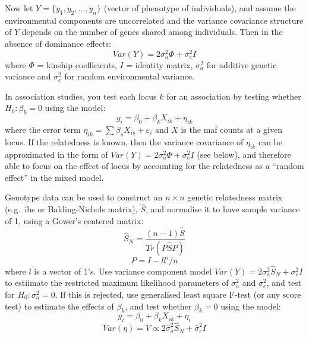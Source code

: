 Now let $Y = \{y_1, y_2,\ldots,y_n\}$ (vector of phenotype of individuals), and assume the environmental components are uncorrelated and the variance covariance structure of $Y$ depends on the number of genes shared among individuals.
Then in the absence of dominance effects:
\begin{equation*}
	Var(Y) = 2\sigma^2_a\Phi + \sigma^2_eI
\end{equation*}
where $\Phi$ = kinship coefficients, $I$ = identity matrix, $\sigma_a^2$ for additive genetic variance and $\sigma_e^2$ for random environmental variance.

In association studies, you test each locus $k$ for an association by testing whether $H_0:\beta_k = 0$ using the model:
\begin{equation*}
	y_i = \beta_0 + \beta_kX_{ik} + \eta_{ik}
\end{equation*}
where the error term $\eta_{ik} = \sum \beta_sX_{is} + \varepsilon_i$ and $X$ is the \gls{maf} counts at a given locus.
If the relatedness is known, then the variance covariance of $\eta_{ik}$ can be approximated in the form of $Var(Y) = 2\sigma^2_a\Phi + \sigma^2_eI$ (see below), and therefore able to focus on the effect of locus by accounting for the relatedness as a ``random effect'' in the mixed model.

Genotype data can be used to construct an $n\times n$ genetic relatedness matrix (e.g.\ \gls{ibs} or Balding-Nichols matrix), $\hat{S}$, and normalise it to have sample variance of 1, using a Gower's centered matrix:
\begin{equation*}
	\hat{S}_N = \frac{(n-1)\hat{S}}{Tr(P\hat{S}P)}
\end{equation*}
\begin{equation*}
	P = I-ll'/n
\end{equation*}
where $l$ is a vector of 1's.
Use variance component model $Var(Y) = 2\sigma^2_a\hat{S}_N + \sigma^2_eI$ to estiimate the restricted maximum likelihood parameters of $\sigma^2_a$ and $\sigma^2_e$, and test for $H_0:\sigma^2_a = 0$.
If this is rejected, use generalised least square F-test (or any score test) to estimate the effects of $\beta_k$, and test whether $\beta_k = 0$ using the model:
\begin{equation*}
	y_i = \beta_0 + \beta_kX_{ik} + \eta_{i}
\end{equation*}
\begin{equation*}
	Var(\eta) = V \propto2\hat{\sigma}^2_a\hat{S}_N + \hat{\sigma}^2_eI
\end{equation*}

